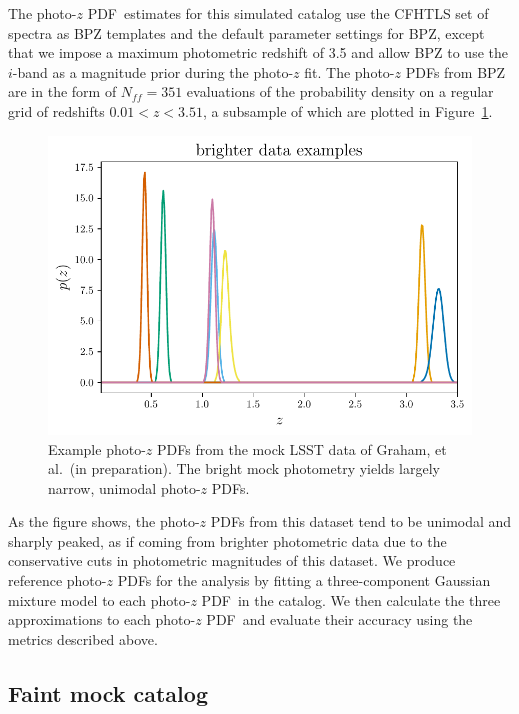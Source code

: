 \documentclass[\docopts]{\docclass}
\newcommand{\pz}{photo-$z$ PDF}
\newcommand{\mgdata}{bright\xspace}
\newcommand{\Ssdata}{Faint\xspace}
\begin{document}
The \pz\ estimates for this simulated catalog use the CFHTLS set of spectra 
\citep{ilbert_accurate_2006} as BPZ templates and the default parameter 
settings for BPZ, except that we impose a maximum photometric redshift of 3.5 
and allow BPZ to use the $i$-band as a magnitude prior during the photo-$z$ fit.
The \pz s from BPZ are in the form of $N_{ff} = 351$ evaluations of the 
probability density on a regular grid of redshifts $0.01 < z < 3.51$, a 
subsample of which are plotted in Figure~\ref{fig:graham_pzs}.

\begin{figure}
  \begin{center}
    \includegraphics[width=\columnwidth]{figures/graham_pzs.pdf}
    \caption{Example \pz s from the mock LSST data of Graham, et al.\ (in 
preparation).
    The \mgdata mock photometry yields largely narrow, unimodal \pz s.
    \label{fig:graham_pzs}}
  \end{center}
\end{figure}

As the figure shows, the \pz s from this dataset tend to be unimodal and 
sharply peaked, as if coming from brighter photometric data due to the 
conservative cuts in photometric magnitudes of this dataset.
We produce reference \pz s for the analysis by fitting a three-component 
Gaussian mixture model to each \pz\ in the catalog.
We then calculate the three approximations to each \pz\ and evaluate their 
accuracy using the metrics described above.

\subsection{\Ssdata mock catalog}
\label{sec:schmidt}
\end{document}
